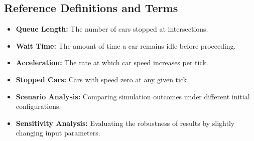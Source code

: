 \documentclass[12pt]{article}
\begin{document}
\subsection{Reference Definitions and Terms}
\begin{itemize}
    \item \textbf{Queue Length:} The number of cars stopped at intersections.
    \item \textbf{Wait Time:} The amount of time a car remains idle before proceeding.
    \item \textbf{Acceleration:} The rate at which car speed increases per tick.
    \item \textbf{Stopped Cars:} Cars with speed zero at any given tick.
    \item \textbf{Scenario Analysis:} Comparing simulation outcomes under different initial configurations.
    \item \textbf{Sensitivity Analysis:} Evaluating the robustness of results by slightly changing input parameters.
\end{itemize}
\end{document}
